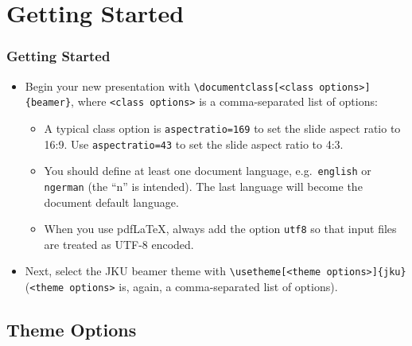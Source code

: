 \documentclass[utf8,aspectratio=169,ngerman,english]{beamer}
\begin{document}
\section{Getting Started}

\begin{frame}[containsverbatim]
\frametitle{Getting Started}

\begin{itemize}
\item Begin your new presentation with \verb|\documentclass[<class options>]{beamer}|, where \verb|<class options>| is a comma-separated list of options:
    \begin{itemize}
    \item A typical class option is \verb|aspectratio=169| to set the slide aspect ratio to 16:9. Use \verb|aspectratio=43| to set the slide aspect ratio to 4:3.
    \item You should define at least one document language, e.g.\ \verb|english| or \verb|ngerman| (the ``n'' is intended). The last language will become the document default language.
    \item When you use pdfLaTeX, always add the option \verb|utf8| so that input files are treated as UTF-8 encoded.
    \end{itemize}

\item Next, select the JKU beamer theme with \verb|\usetheme[<theme options>]{jku}| (\verb|<theme options>| is, again, a comma-separated list of options).
\end{itemize}
\end{frame}


\subsection{Theme Options}
\end{document}
